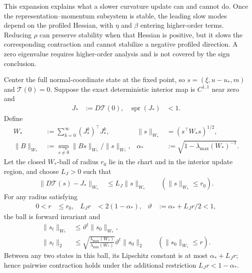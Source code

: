 This expansion explains what a slower curvature update can and cannot do. Once the representation--momentum subsystem is stable, the leading slow modes depend on the profiled Hessian, with $\eta$ and $\beta$ entering higher-order terms. Reducing $\rho$ can preserve stability when that Hessian is positive, but it slows the corresponding contraction and cannot stabilize a negative profiled direction. A zero eigenvalue requires higher-order analysis and is not covered by the sign conclusion.

\begin{theorem}
\label{thm:rigid-local-attraction}
Center the full normal-coordinate state at the fixed point, so $s=(\xi,u-u_*,m)$ and $\mathcal T(0)=0$. Suppose the exact deterministic interior map is $C^{1,1}$ near zero and
\begin{align}
 J_*&:=D\mathcal T(0),&\operatorname{spr}(J_*)&<1.
\end{align}
Define
\begin{align}
 W_*&:=\sum_{k=0}^{\infty}(J_*^k)^\top J_*^k,&
 \|s\|_{W_*}&=(s^\top W_*s)^{1/2},\\
 \|B\|_{W_*}&:=\sup_{s\ne0}\|Bs\|_{W_*}/\|s\|_{W_*},&
 \alpha_*&:=\sqrt{1-\lambda_{\max}(W_*)^{-1}}.
\end{align}
Let the closed $W_*$-ball of radius $r_0$ lie in the chart and in the interior update region, and choose $L_J>0$ such that
\begin{align}
 \|D\mathcal T(s)-J_*\|_{W_*}&\le L_J\|s\|_{W_*}
 \qquad(\|s\|_{W_*}\le r_0).
\end{align}
For any radius satisfying
\begin{align}
 0<r&\le r_0,&L_Jr&<2(1-\alpha_*),&
 \vartheta&:=\alpha_*+L_Jr/2<1,
\end{align}
the ball is forward invariant and
\begin{align}\label{eq:rigid-local-attraction}
 \|s_t\|_{W_*}&\le\vartheta^t\|s_0\|_{W_*},\\
 \|s_t\|_2&\le
 \sqrt{\frac{\lambda_{\max}(W_*)}{\lambda_{\min}(W_*)}}
 \vartheta^t\|s_0\|_2
 \qquad(\|s_0\|_{W_*}\le r).
\end{align}
Between any two states in this ball, its Lipschitz constant is at most $\alpha_*+L_Jr$; hence pairwise contraction holds under the additional restriction $L_Jr<1-\alpha_*$.
\end{theorem}
